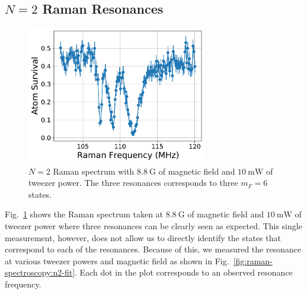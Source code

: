 \subsection{\texorpdfstring{$N=2$}{N=2} Raman Resonances}
\label{ch:raman-spectroscopy:n2:resonances}

\begin{figure}
  \centering
  \includegraphics[width=0.7\textwidth]{figures/raman_spectroscopy_n2_resonance.pdf}
  \caption[$N=2$ Raman spectrum.]{
    $N=2$ Raman spectrum with $8.8~\mathrm{G}$ of magnetic field
    and $10~\mathrm{mW}$ of tweezer power.
    The three resonances corresponds to three $m_F=6$ states.
    \label{fig:raman-spectroscopy:n2}}
\end{figure}

Fig.~\ref{fig:raman-spectroscopy:n2} shows the Raman spectrum taken
at $8.8~\mathrm{G}$ of magnetic field and $10~\mathrm{mW}$ of tweezer power
where three resonances can be clearly seen as expected.
This single measurement, however, does not allow us to directly identify the states
that correspond to each of the resonances.
Because of this, we measured the resonance at various tweezer powers and magnetic field
as shown in Fig.~\ref{fig:raman-spectroscopy:n2-fit}.
Each dot in the plot corresponds to an observed resonance frequency.

